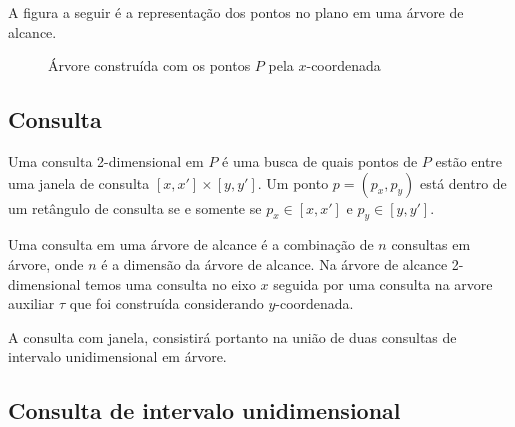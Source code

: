 A figura a seguir é a representação dos pontos no plano em uma árvore de alcance.
\begin{figure}[H]
 \caption{Árvore construída com os pontos $P$ pela $x$-coordenada}
\end{figure}

\subsection{Consulta}

Uma consulta 2-dimensional em $P$ é uma busca de quais pontos de $P$ estão entre uma janela de consulta
$[x, x'] \times [y, y']$. Um ponto $p = (p_x, p_y)$ está dentro de um retângulo de consulta se e somente
se $p_x \in [x, x']$ e $p_y \in [y, y']$. \cite{cg_rt1}

Uma consulta em uma árvore de alcance é a combinação de $n$ consultas em árvore, onde $n$ é a dimensão
da árvore de alcance.
Na árvore de alcance 2-dimensional temos uma consulta no eixo $x$ seguida por uma consulta na arvore 
auxiliar $\tau$ que foi construída considerando $y$-coordenada.

A consulta com janela, consistirá portanto na união de duas consultas de intervalo unidimensional em
árvore.

\subsection{Consulta de intervalo unidimensional}


